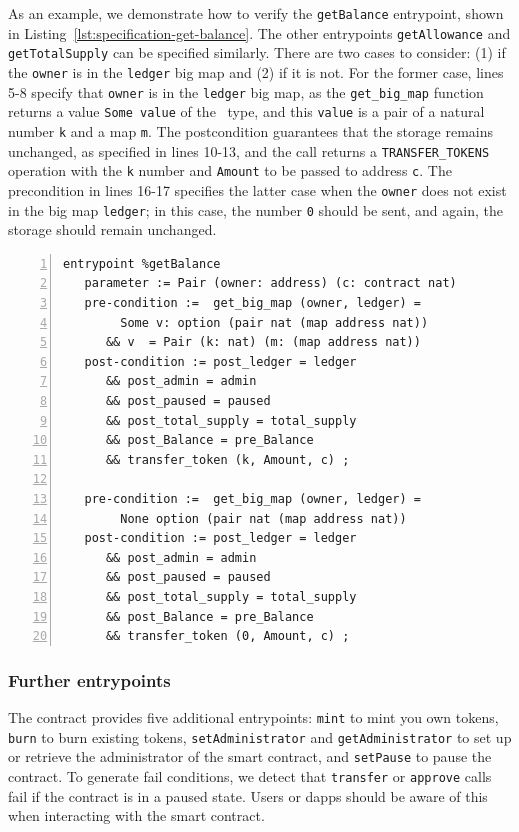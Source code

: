 \documentclass[a4paper,USenglish,cleveref, autoref,anonymous]{lipics-v2021}
\begin{document}
As an example, we demonstrate how to verify the \lstinline/getBalance/
entrypoint,  shown in Listing~\ref{lst:specification-get-balance}. The
other entrypoints \lstinline/getAllowance/ and
\lstinline/getTotalSupply/ can be specified similarly.  There are two
cases to consider: (1) if the \lstinline/owner/ is in the
\lstinline/ledger/ big map and (2) if it is not. For the former case,
lines 5-8 specify that \lstinline/owner/ is in the \lstinline/ledger/
big map, as the \lstinline/get_big_map/ function returns a value
\lstinline/Some value/ of the \TOPTION\ type, and this
\lstinline/value/ is a pair of a natural number \lstinline/k/ and a
map \lstinline/m/. The postcondition guarantees that the storage
remains unchanged, as specified in lines 10-13, and the call returns a
\lstinline/TRANSFER_TOKENS/ operation with the \lstinline/k/ number
and \lstinline/Amount/ to be passed to address \lstinline/c/. The
precondition in lines 16-17 specifies the latter case when the
\lstinline/owner/ does not exist in the big map \lstinline/ledger/; in
this case, the number \lstinline/0/ should be sent, and again, the
storage should remain unchanged. 

\begin{lstlisting}[float=tp,captionpos=b,caption={Specification of the \lstinline/getBalance/ entrypoint},label={lst:specification-get-balance},numbers=left]
entrypoint %getBalance
   parameter := Pair (owner: address) (c: contract nat)
   pre-condition :=  get_big_map (owner, ledger) = 
        Some v: option (pair nat (map address nat)) 
      && v  = Pair (k: nat) (m: (map address nat))
   post-condition := post_ledger = ledger 
      && post_admin = admin 
      && post_paused = paused 
      && post_total_supply = total_supply 
      && post_Balance = pre_Balance 
      && transfer_token (k, Amount, c) ;

   pre-condition :=  get_big_map (owner, ledger) = 
        None option (pair nat (map address nat)) 
   post-condition := post_ledger = ledger 
      && post_admin = admin 
      && post_paused = paused 
      && post_total_supply = total_supply 
      && post_Balance = pre_Balance 
      && transfer_token (0, Amount, c) ;
\end{lstlisting}
\subsubsection{Further entrypoints}
\label{sec:other-entrypoints}

The contract provides five additional entrypoints: \lstinline/mint/ to
mint you own tokens, \lstinline/burn/ to burn existing tokens,
\lstinline/setAdministrator/ and \lstinline/getAdministrator/ to set
up or retrieve the administrator of the smart contract, and
\lstinline/setPause/ to pause the contract. To generate fail
conditions, we detect that \lstinline/transfer/ or \lstinline/approve/
calls fail if the contract is in a paused state. Users or dapps should
be aware of this when interacting with the smart contract. 
\end{document}
